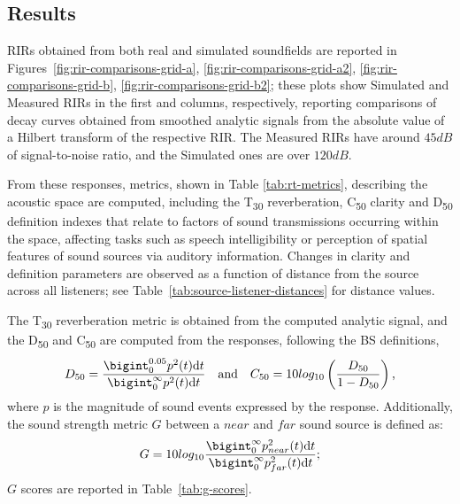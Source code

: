 \subsection{Results}
RIRs obtained from both real and simulated soundfields are reported in Figures~\ref{fig:rir-comparisons-grid-a}, \ref{fig:rir-comparisons-grid-a2}, \ref{fig:rir-comparisons-grid-b}, \ref{fig:rir-comparisons-grid-b2}; these plots show Simulated and Measured RIRs in the first and columns, respectively, reporting comparisons of decay curves obtained from smoothed analytic signals from the absolute value of a Hilbert transform of the respective RIR. The Measured RIRs have around $45dB$ of signal-to-noise ratio, and the Simulated ones are over $120dB$. \par
From these responses, metrics, shown in Table \ref{tab:rt-metrics}, describing the acoustic space are computed, including the T\textsubscript{30} reverberation, C\textsubscript{50} clarity and D\textsubscript{50} definition indexes that relate to factors of sound transmissions occurring within the space, affecting tasks such as speech intelligibility or perception of spatial features of sound sources via auditory information. Changes in clarity and definition parameters are observed as a function of distance from the source across all listeners; see Table~\ref{tab:source-listener-distances} for distance values. \par
The T\textsubscript{30} reverberation metric is obtained from the computed analytic signal, and the D\textsubscript{50} and C\textsubscript{50} are computed from the responses, following the BS \cite{bs3382-1} definitions,
\begin{equation}
    D_{50} = \frac{\bigint_{0}^{0.05} p^2(t)\textrm{d}t}{\bigint_{0}^{\infty} p^2(t)\textrm{d}t}\quad \textrm{and} \quad C_{50} = 10log_{10} \left( \frac{D_{50}}{1-D_{50}} \right)\textrm{,}
\end{equation}
where $p$ is the magnitude of sound events expressed by the response. Additionally, the sound strength metric $G$ between a $near$ and $far$ sound source is defined as:
\begin{equation}
    G = 10 log_{10} \frac{\bigint_{0}^{\infty} p_{near}^2(t)\textrm{d}t}{\bigint_{0}^{\infty} p_{far}^2(t)\textrm{d}t} \textrm{;}
\end{equation}
$G$ scores are reported in Table~\ref{tab:g-scores}.

